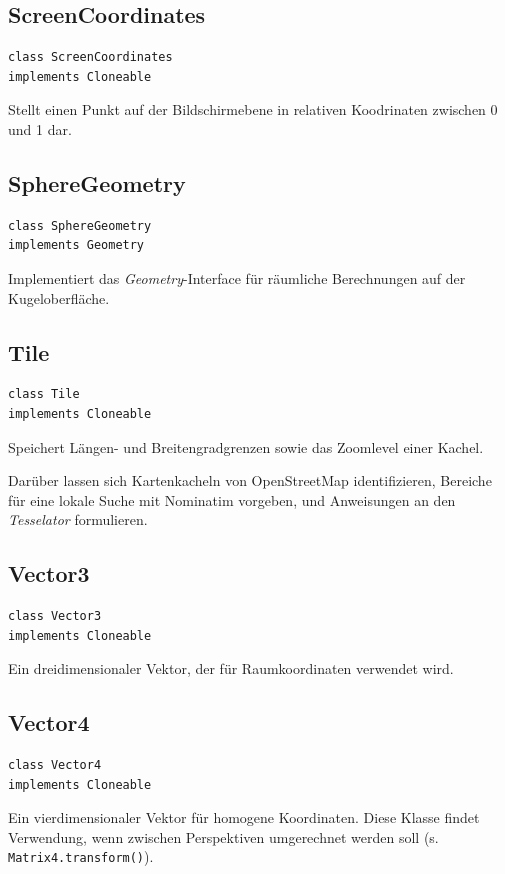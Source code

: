 \documentclass[10pt]{scrreprt}
\begin{document}
\vspace{5mm}
\subsection*{ScreenCoordinates}
\begin{lstlisting}
class ScreenCoordinates
implements Cloneable
\end{lstlisting}
Stellt einen Punkt auf der Bildschirmebene in relativen Koodrinaten zwischen 0 und 1 dar.\\

\vspace{5mm}
\subsection*{SphereGeometry}
\begin{lstlisting}
class SphereGeometry
implements Geometry
\end{lstlisting}
Implementiert das \textit{Geometry}-Interface für räumliche Berechnungen auf der Kugeloberfläche.\\

\vspace{5mm}
\subsection*{Tile}
\begin{lstlisting}
class Tile 
implements Cloneable
\end{lstlisting}
Speichert Längen- und Breitengradgrenzen sowie das Zoomlevel einer Kachel.

Darüber lassen sich Kartenkacheln von OpenStreetMap identifizieren, Bereiche für eine lokale Suche mit Nominatim vorgeben, und Anweisungen an den \textit{Tesselator} formulieren.\\

\pagebreak
\subsection*{Vector3}
\begin{lstlisting}
class Vector3
implements Cloneable
\end{lstlisting}
Ein dreidimensionaler Vektor, der für Raumkoordinaten verwendet wird.\\

\vspace{5mm}
\subsection*{Vector4}
\begin{lstlisting}
class Vector4
implements Cloneable
\end{lstlisting}
Ein vierdimensionaler Vektor für homogene Koordinaten. Diese Klasse findet Verwendung, wenn zwischen Perspektiven umgerechnet werden soll (s. \texttt{Matrix4.transform()}).\\
\end{document}
